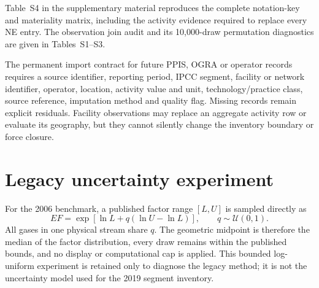 Table~S4 in the supplementary material reproduces the complete notation-key and materiality
matrix, including the activity evidence required to replace every NE entry. The observation
join audit and its 10,000-draw permutation diagnostics are given in Tables~S1--S3.

The permanent import contract for future PPIS, OGRA or operator records requires a source
identifier, reporting period, IPCC segment, facility or network identifier, operator, location,
activity value and unit, technology/practice class, source reference, imputation method and
quality flag. Missing records remain explicit residuals. Facility observations may replace an
aggregate activity row or evaluate its geography, but they cannot silently change the inventory
boundary or force closure.

\section{Legacy uncertainty experiment}
\label{app:legacy}

For the 2006 benchmark, a published factor range $[L,U]$ is sampled directly as
\begin{equation}
EF=\exp\left[\ln L+q(\ln U-\ln L)\right],\qquad q\sim\mathcal{U}(0,1).
\end{equation}
All gases in one physical stream share $q$. The geometric midpoint is therefore the median of
the factor distribution, every draw remains within the published bounds, and no display or
computational cap is applied. This bounded log-uniform experiment is retained only to diagnose
the legacy method; it is not the uncertainty model used for the 2019 segment inventory.

